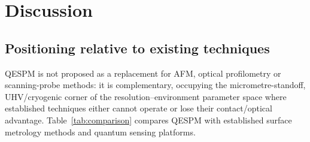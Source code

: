 \documentclass[12pt,a4paper]{article}
\begin{document}
\section{Discussion}
\label{sec:discussion}

\subsection{Positioning relative to existing techniques}

QESPM is not proposed as a replacement for AFM, optical profilometry or
scanning-probe methods: it is complementary, occupying the
micrometre-standoff, UHV/cryogenic corner of the
resolution--environment parameter space where established techniques
either cannot operate or lose their contact/optical advantage.
Table~\ref{tab:comparison} compares QESPM with established surface
metrology methods and quantum sensing platforms.
\end{document}
